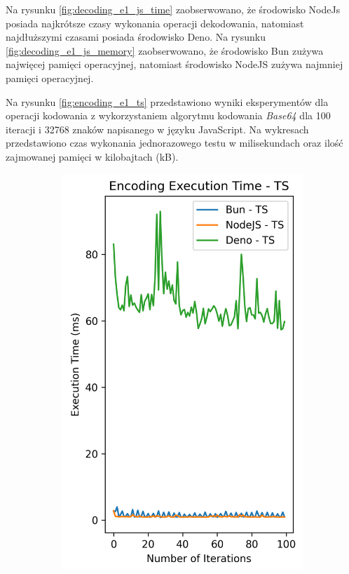 Na rysunku \ref{fig:decoding_e1_js_time} zaobserwowano, że środowisko NodeJs posiada najkrótsze czasy wykonania operacji dekodowania, natomiast najdłuższymi czasami posiada środowisko Deno. Na rysunku \ref{fig:decoding_e1_js_memory} zaobserwowano, że środowisko Bun zużywa najwięcej pamięci operacyjnej, natomiast środowisko NodeJS zużywa najmniej pamięci operacyjnej.

Na rysunku \ref{fig:encoding_e1_ts} przedstawiono wyniki eksperymentów dla operacji kodowania z wykorzystaniem algorytmu kodowania \textit{Base64} dla 100 iteracji i 32768 znaków napisanego w języku JavaScript. Na wykresach przedstawiono czas wykonania jednorazowego testu w milisekundach oraz ilość zajmowanej pamięci w kilobajtach (kB).

\begin{figure}[H]
  \centering
  \begin{subfigure}[b]{0.44\textwidth}
    \centering
    \includegraphics[width=\textwidth]{Figures/coding/base64_100_encoding_ts_time.png}

\end{subfigure}
\end{figure}
